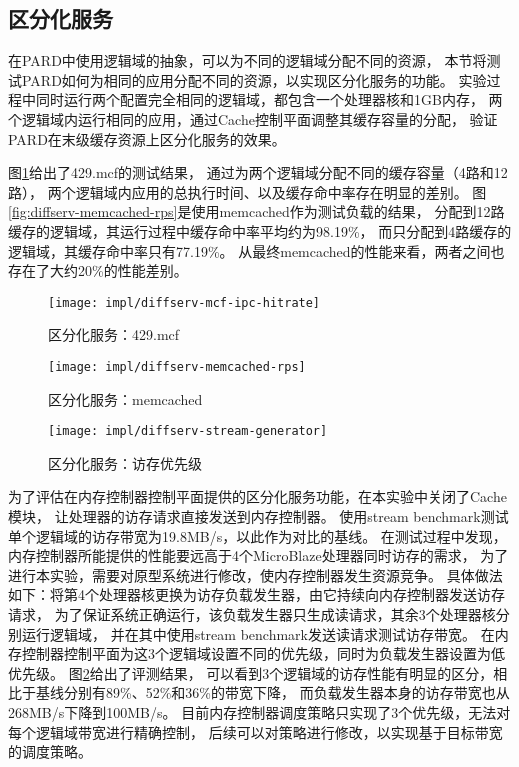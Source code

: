 \subsection{区分化服务}

在PARD中使用逻辑域的抽象，可以为不同的逻辑域分配不同的资源，
本节将测试PARD如何为相同的应用分配不同的资源，以实现区分化服务的功能。
实验过程中同时运行两个配置完全相同的逻辑域，都包含一个处理器核和1GB内存，
两个逻辑域内运行相同的应用，通过Cache控制平面调整其缓存容量的分配，
验证PARD在末级缓存资源上区分化服务的效果。

图\ref{fig:diffserv-mcf-ipc-hitrate}给出了429.mcf的测试结果，
通过为两个逻辑域分配不同的缓存容量（4路和12路），
两个逻辑域内应用的总执行时间、以及缓存命中率存在明显的差别。
图\ref{fig:diffserv-memcached-rps}是使用memcached作为测试负载的结果，
分配到12路缓存的逻辑域，其运行过程中缓存命中率平均约为98.19\%，
而只分配到4路缓存的逻辑域，其缓存命中率只有77.19\%。
从最终memcached的性能来看，两者之间也存在了大约20\%的性能差别。

\begin{figure}[tb]
  \centering
  \texttt{[image: impl/diffserv-mcf-ipc-hitrate]}
  \caption{区分化服务：429.mcf}
  \label{fig:diffserv-mcf-ipc-hitrate}
\end{figure}

\begin{figure}[tb]
\begin{minipage}[b]{0.48\textwidth}
  \centering
  \texttt{[image: impl/diffserv-memcached-rps]}
  \caption{区分化服务：memcached}
  \label{fig:diffserv-memcached-rps}
\end{minipage}\hfill
\begin{minipage}[b]{0.48\textwidth}
  \centering
  \texttt{[image: impl/diffserv-stream-generator]}
  \caption{区分化服务：访存优先级}
  \label{fig:diffserv-stream-generator}
\end{minipage}
\end{figure}

为了评估在内存控制器控制平面提供的区分化服务功能，在本实验中关闭了Cache模块，
让处理器的访存请求直接发送到内存控制器。
使用stream benchmark\cite{stream}测试单个逻辑域的访存带宽为19.8MB/s，以此作为对比的基线。
在测试过程中发现，内存控制器所能提供的性能要远高于4个MicroBlaze处理器同时访存的需求，
为了进行本实验，需要对原型系统进行修改，使内存控制器发生资源竞争。
具体做法如下：将第4个处理器核更换为访存负载发生器，由它持续向内存控制器发送访存请求，
为了保证系统正确运行，该负载发生器只生成读请求，其余3个处理器核分别运行逻辑域，
并在其中使用stream benchmark发送读请求测试访存带宽。
在内存控制器控制平面为这3个逻辑域设置不同的优先级，同时为负载发生器设置为低优先级。
图\ref{fig:diffserv-stream-generator}给出了评测结果，
可以看到3个逻辑域的访存性能有明显的区分，相比于基线分别有89\%、52\%和36\%的带宽下降，
而负载发生器本身的访存带宽也从268MB/s下降到100MB/s。
目前内存控制器调度策略只实现了3个优先级，无法对每个逻辑域带宽进行精确控制，
后续可以对策略进行修改，以实现基于目标带宽的调度策略。


